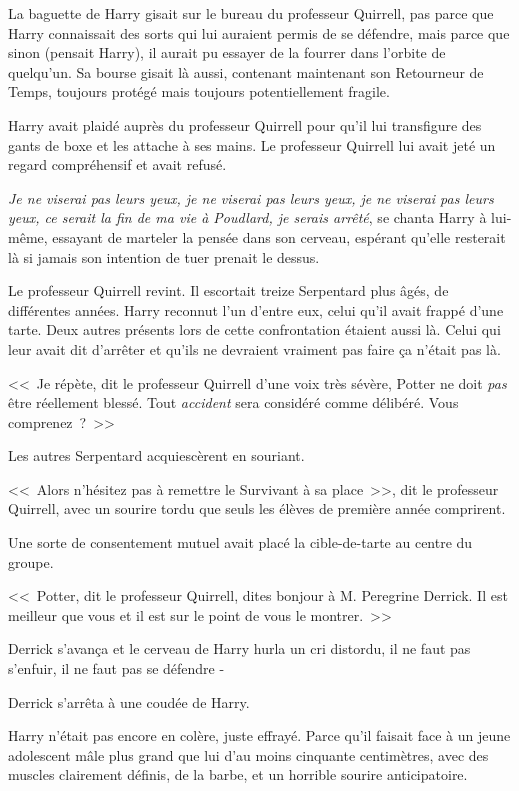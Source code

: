 La baguette de Harry gisait sur le bureau du professeur Quirrell, pas parce que Harry connaissait des sorts qui lui auraient permis de se défendre, mais parce que sinon (pensait Harry), il aurait pu essayer de la fourrer dans l'orbite de quelqu'un. Sa bourse gisait là aussi, contenant maintenant son Retourneur de Temps, toujours protégé mais toujours potentiellement fragile.

Harry avait plaidé auprès du professeur Quirrell pour qu'il lui transfigure des gants de boxe et les attache à ses mains. Le professeur Quirrell lui avait jeté un regard compréhensif et avait refusé.

\emph{Je ne viserai pas leurs yeux, je ne viserai pas leurs yeux, je ne viserai pas leurs yeux, ce serait la fin de ma vie à Poudlard, je serais arrêté}, se chanta Harry à lui-même, essayant de marteler la pensée dans son cerveau, espérant qu'elle resterait là si jamais son intention de tuer prenait le dessus.

Le professeur Quirrell revint. Il escortait treize Serpentard plus âgés, de différentes années. Harry reconnut l'un d'entre eux, celui qu'il avait frappé d'une tarte. Deux autres présents lors de cette confrontation étaient aussi là. Celui qui leur avait dit d'arrêter et qu'ils ne devraient vraiment pas faire ça n'était pas là.

<<~Je répète, dit le professeur Quirrell d'une voix très sévère, Potter ne doit \emph{pas} être réellement blessé. Tout \emph{accident} sera considéré comme délibéré. Vous comprenez~?~>>

Les autres Serpentard acquiescèrent en souriant.

<<~Alors n'hésitez pas à remettre le Survivant à sa place~>>, dit le professeur Quirrell, avec un sourire tordu que seuls les élèves de première année comprirent.

Une sorte de consentement mutuel avait placé la cible-de-tarte au centre du groupe.

<<~Potter, dit le professeur Quirrell, dites bonjour à M. Peregrine Derrick. Il est meilleur que vous et il est sur le point de vous le montrer.~>>

Derrick s'avança et le cerveau de Harry hurla un cri distordu, il ne faut pas s'enfuir, il ne faut pas se défendre -

Derrick s'arrêta à une coudée de Harry.

Harry n'était pas encore en colère, juste effrayé. Parce qu'il faisait face à un jeune adolescent mâle plus grand que lui d'au moins cinquante centimètres, avec des muscles clairement définis, de la barbe, et un horrible sourire anticipatoire.

